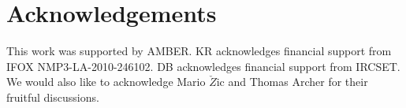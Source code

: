 \documentclass[reprint,aip,apl,floatfix,linenumbers,superscriptaddress]{revtex4-1}
\begin{document}
\section{Acknowledgements}
\label{sec:acknowledgements}
This work was supported by AMBER. KR acknowledges financial support from IFOX NMP3-LA-2010-246102. DB acknowledges financial support from IRCSET. We would also like to acknowledge Mario $\check{Z}$ic and Thomas Archer for their fruitful discussions.


\end{document}
